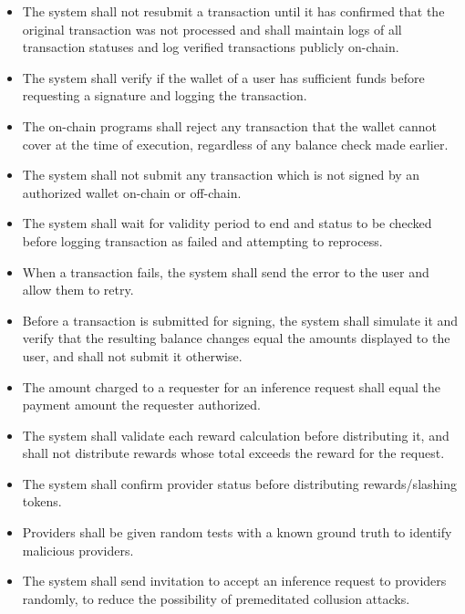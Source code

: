 \documentclass{article}
\newcommand{\saref}[1]{\ref{#1}}
\begin{document}
\noindent \begin{itemize}

\item[\saref{SA_NoDuplicateSubmission}:]
The system shall not resubmit a transaction until it has confirmed that the original transaction was not processed and shall maintain logs of all transaction statuses and log verified transactions publicly on-chain.

\item[\saref{SA_BalanceCheck}:]
The system shall verify if the wallet of a user has sufficient funds before requesting a signature and logging the transaction.

\item[\saref{SA_OnChainFundsCheck}:]
The on-chain programs shall reject any transaction that the wallet cannot cover at the time of execution, regardless of any balance check made earlier.

\item[\saref{SA_SignedTransactionsOnly}:]
The system shall not submit any transaction which is not signed by an authorized wallet on-chain or off-chain.

\item[\saref{SA_ExpiryCheck}:]
The system shall wait for validity period to end and status to be checked before logging transaction as failed and attempting to reprocess.

\item[\saref{SA_FailureRetry}:]
When a transaction fails, the system shall send the error to the user and allow them to retry.

\item[\saref{SA_TransactionSimulation}:]
Before a transaction is submitted for signing, the system shall simulate it and verify that the resulting balance changes equal the amounts displayed to the user, and shall not submit it otherwise.

\item[\saref{SA_ChargeEqualsAuthorized}:]
The amount charged to a requester for an inference request shall equal the payment amount the requester authorized.

\item[\saref{SA_RewardValidation}:]
The system shall validate each reward calculation before distributing it, and shall not distribute rewards whose total exceeds the reward for the request.

\item[\saref{SA_ProviderStatusCheck}:]
The system shall confirm provider status before distributing rewards/slashing tokens.

\item[SA.HA.1 \label{SA_GroundTruthTests}:]
Providers shall be given random tests with a known ground truth to identify malicious providers.

\item[SA.HA.2 \label{SA_RandomInvitations}:]
The system shall send invitation to accept an inference request to providers randomly, to reduce the possibility of premeditated collusion attacks.

\end{itemize}
\end{document}
